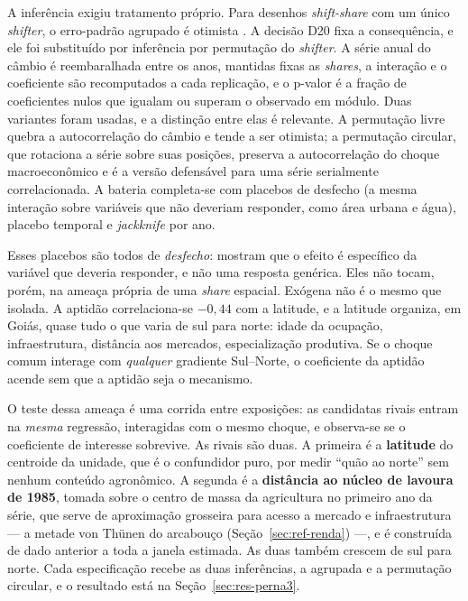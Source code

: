 A inferência exigiu tratamento próprio. Para desenhos \emph{shift-share} com um único \emph{shifter}, o
erro-padrão agrupado é otimista \cite{Adao2019, Borusyak2022}. A decisão D20
fixa a consequência, e ele foi substituído por inferência por
permutação do \emph{shifter}. A série anual do câmbio é reembaralhada entre os anos,
mantidas fixas as \emph{shares}, a interação e o coeficiente são recomputados a cada
replicação, e o p-valor é a fração de coeficientes nulos que igualam ou
superam o observado em módulo. Duas variantes foram usadas, e a distinção
entre elas é relevante. A permutação livre quebra a autocorrelação do câmbio e
tende a ser otimista; a permutação circular, que rotaciona a série sobre suas
posições, preserva a autocorrelação do choque macroeconômico e é a versão
defensável para uma série serialmente correlacionada. A bateria completa-se
com placebos de desfecho (a mesma interação sobre variáveis que não deveriam
responder, como área urbana e água), placebo temporal e \emph{jackknife} por ano.

Esses placebos são todos de \emph{desfecho}: mostram que o efeito é específico
da variável que deveria responder, e não uma resposta genérica. Eles não tocam,
porém, na ameaça própria de uma \emph{share} espacial. Exógena não é o mesmo
que isolada. A aptidão correlaciona-se $-0{,}44$ com a latitude, e a latitude
organiza, em Goiás, quase tudo o que varia de sul para norte: idade da
ocupação, infraestrutura, distância aos mercados, especialização produtiva. Se
o choque comum interage com \emph{qualquer} gradiente Sul--Norte, o coeficiente
da aptidão acende sem que a aptidão seja o mecanismo.

O teste dessa ameaça é uma corrida entre exposições: as candidatas rivais
entram na \emph{mesma} regressão, interagidas com o mesmo choque, e observa-se
se o coeficiente de interesse sobrevive. As rivais são duas. A primeira é a
\textbf{latitude} do centroide da unidade, que é o confundidor puro, por medir
``quão ao norte'' sem nenhum conteúdo agronômico. A segunda é a
\textbf{distância ao núcleo de lavoura de 1985}, tomada sobre o centro de massa
da agricultura no primeiro ano da série, que serve de aproximação grosseira
para acesso a mercado e infraestrutura --- a metade von Thünen do arcabouço
(Seção~\ref{sec:ref-renda}) ---, e é construída de dado anterior a toda a
janela estimada. As duas também crescem de sul para norte. Cada especificação
recebe as duas inferências, a agrupada e a permutação circular, e o resultado
está na Seção~\ref{sec:res-perna3}.

